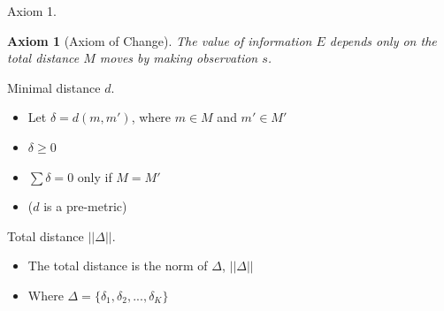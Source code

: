 \documentclass[10pt]{beamer}
\newtheorem{axiom}{Axiom}
\begin{document}
\begin{frame}[fragile]{Axiom 1.}
\begin{axiom}
    [Axiom of Change] The value of information $E$ depends only on the total distance $M$ moves by making observation $s$.
    \label{ax:1} 
\end{axiom}
\end{frame}

\begin{frame}[fragile]{Minimal distance $d$.}
\begin{itemize}
    \item Let $\delta = d(m,m')$, where $m \in M$ and $m' \in M'$
    \item $\delta \ge 0$
    \item $\sum \delta = 0$ only if $M = M'$
    \item ($d$ is a pre-metric)
\end{itemize}
\end{frame}



\begin{frame}[fragile]{Total distance $||\Delta||$.}
\begin{itemize}
\item The total distance is the norm of $\Delta$, $||\Delta||$
\item Where $\Delta = \{\delta_1, \delta_2,...,\delta_K\}$
\end{itemize}
\end{frame}
\end{document}
